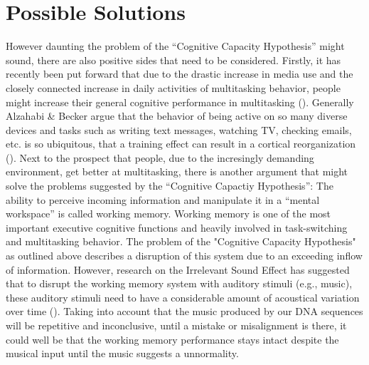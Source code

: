 \documentclass[10pt]{article}
\begin{document}
\section{Possible Solutions}
However daunting the problem of the “Cognitive Capacity Hypothesis” might sound, there are also positive sides that need to be considered. Firstly, it has recently been put forward that due to the drastic increase in media use and the closely connected increase in daily activities of multitasking behavior, people might increase their general cognitive performance in multitasking (\cite{Alzahabi_Becker_2013}). Generally Alzahabi \& Becker argue that the behavior of being active on so many diverse devices and tasks such as writing text messages, watching TV, checking emails, etc. is so ubiquitous, that a training effect can result in a cortical reorganization (\cite{Draganski_May_2008}). Next to the prospect that people, due to the incresingly demanding environment, get better at multitasking, there is another argument that might solve the problems suggested by the “Cognitive Capactiy Hypothesis”: The ability to perceive incoming information and manipulate it in a “mental workspace” is called working memory. Working memory is one of the most important executive cognitive functions and heavily involved in task-switching and multitasking behavior. The problem of the "Cognitive Capacity Hypothesis" as outlined above describes a disruption of this system due to an exceeding inflow of information. However, research on the Irrelevant Sound Effect has suggested that to disrupt the working memory system with auditory stimuli (e.g., music), these auditory stimuli need to have a considerable amount of acoustical variation over time (\cite{Vizard_Perham_2010}). Taking into account that the music produced by our DNA sequences will be repetitive and inconclusive, until a mistake or misalignment is there, it could well be that the working memory performance stays intact despite the musical input until the music suggests a unnormality.
\end{document}

